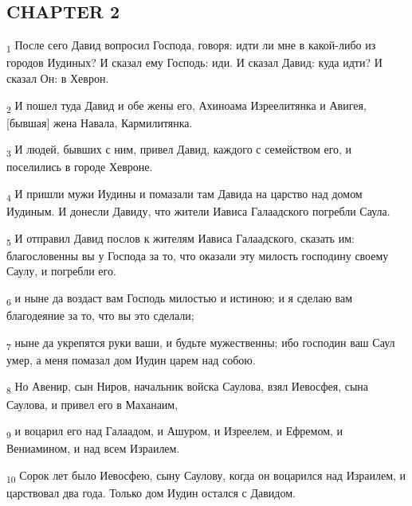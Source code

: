 \subsection{CHAPTER 2}
\begin{tcolorbox}
\textsubscript{1} После сего Давид вопросил Господа, говоря: идти ли мне в какой-либо из городов Иудиных? И сказал ему Господь: иди. И сказал Давид: куда идти? И сказал Он: в Хеврон.
\end{tcolorbox}
\begin{tcolorbox}
\textsubscript{2} И пошел туда Давид и обе жены его, Ахиноама Изреелитянка и Авигея, [бывшая] жена Навала, Кармилитянка.
\end{tcolorbox}
\begin{tcolorbox}
\textsubscript{3} И людей, бывших с ним, привел Давид, каждого с семейством его, и поселились в городе Хевроне.
\end{tcolorbox}
\begin{tcolorbox}
\textsubscript{4} И пришли мужи Иудины и помазали там Давида на царство над домом Иудиным. И донесли Давиду, что жители Иависа Галаадского погребли Саула.
\end{tcolorbox}
\begin{tcolorbox}
\textsubscript{5} И отправил Давид послов к жителям Иависа Галаадского, сказать им: благословенны вы у Господа за то, что оказали эту милость господину своему Саулу, и погребли его.
\end{tcolorbox}
\begin{tcolorbox}
\textsubscript{6} и ныне да воздаст вам Господь милостью и истиною; и я сделаю вам благодеяние за то, что вы это сделали;
\end{tcolorbox}
\begin{tcolorbox}
\textsubscript{7} ныне да укрепятся руки ваши, и будьте мужественны; ибо господин ваш Саул умер, а меня помазал дом Иудин царем над собою.
\end{tcolorbox}
\begin{tcolorbox}
\textsubscript{8} Но Авенир, сын Ниров, начальник войска Саулова, взял Иевосфея, сына Саулова, и привел его в Маханаим,
\end{tcolorbox}
\begin{tcolorbox}
\textsubscript{9} и воцарил его над Галаадом, и Ашуром, и Изреелем, и Ефремом, и Вениамином, и над всем Израилем.
\end{tcolorbox}
\begin{tcolorbox}
\textsubscript{10} Сорок лет было Иевосфею, сыну Саулову, когда он воцарился над Израилем, и царствовал два года. Только дом Иудин остался с Давидом.
\end{tcolorbox}
